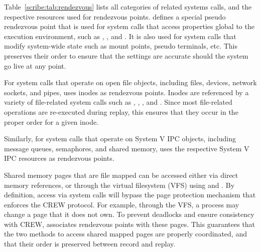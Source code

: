 \begin{table}[]
  

Table~\ref{scribe:tab:rendezvous} lists all categories of related systems
calls, and the respective resources used for rendezvous points.
\scribe{} defines a special pseudo rendezvous point that
is used for system calls that access properties global to the
execution environment, such as , , and
. It is also used for system calls that modify
system-wide state such as mount points, pseudo terminals, etc.  This
preserves their order to ensure that the settings are accurate should
the system go live at any point.

  

For system calls that operate on open file objects, including files,
devices, network sockets, and pipes, \scribe{} uses inodes as
rendezvous points.  Inodes are referenced by a variety of file-related
system calls such as , ,
,
and .  Since most
file-related operations are re-executed during replay, this ensures
that they occur in the proper order for a given inode.
 
Similarly, for system calls that operate on System V IPC
objects, including message queues, semaphores, and shared memory,
\scribe{} uses the respective System V IPC resources as rendezvous points.

Shared memory pages that are file mapped can be accessed either via
direct memory references, or through the virtual filesystem (VFS)
using  and . By definition, access via
system calls will bypass the page protection mechanism that enforces
the CREW protocol. For example, through the VFS, a process may change a
page that it does not own. To prevent deadlocks and ensure consistency
with CREW, \scribe{} associates rendezvous points with these pages.
This guarantees that the two methods to access shared mapped pages are
properly coordinated, and that their order is preserved between record
and replay.


\end{table}
